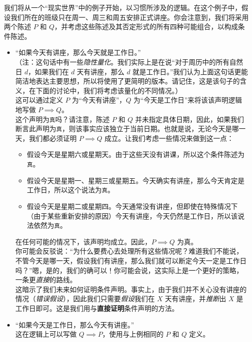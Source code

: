 \begin{example}
    我们将从一个``现实世界''中的例子开始，以习惯所涉及的逻辑。在这个例子中，假设我们所在的班级只在周一、周三和周五安排正式讲座。你会注意到，我们将采用两个陈述 $P$ 和 $Q$，并考虑这些陈述及其否定形式的所有四种可能组合，以构成条件陈述。
    \begin{itemize}
        \item ``如果今天有讲座，那么今天就是工作日。''\\
        （注：这句话中有一些\emph{隐性量化}。我们实际上是在说``对于周历中的所有自然日 $d$，如果我们在 $d$ 天有讲座，那么 $d$ 就是工作日。''我们认为上面这句话更能简洁地表达主要思想，所以将使用了更简明的版本。请记住，这是该句子的含义，在下面的讨论中，我们将考虑该量化的不同情况。）\\
        这可以通过定义 $P$ 为``今天有讲座''，$Q$ 为``今天是工作日''来将该该声明逻辑地写做 $P \implies Q$。\\
        这个声明为\verb|真|吗？请注意，陈述 $P$ 和 $Q$ 并未指定具体日期，因此，如果我们断言此声明为\verb|真|，则该事实应该独立于当前日期。也就是说，无论今天是哪一天，我们都必须证明 $P \implies Q$ 成立。让我们考虑一些情况来做到这一点：
        \begin{itemize}[label=--]
            \item 假设今天是星期六或星期天。由于这些天没有讲课，所以这个条件陈述为\verb|真|。
            \item 假设今天是星期一、星期三或星期五。今天确实有讲座，那么今天肯定是工作日，所以这个说法为\verb|真|。
            \item 假设今天是星期二或星期四。今天通常没有讲座，但即使在特殊情况下（由于某些重新安排的原因）今天有讲座，今天仍然是工作日，所以该说法依然为\verb|真|。
        \end{itemize}
        在任何可能的情况下，该声明均成立。因此，$P \implies Q$ 为真。\\
        你可能会反驳说：``为什么要费心去处理所有这些情况呢？难道我们不能说，不管今天是哪一天，假设我们有讲座，那么我们就可以断定今天一定是工作日吗？''嗯，是的，我们的确可以！你可能会说，这实际上是一个更好的策略，一条更\emph{直接}的路线。\\
        这暗示了我们未来如何证明条件声明。事实上，由于我们并不关心没有讲座的情况（\emph{错误假设}），因此我们只需要\emph{假设}我们在 $X$ 天有讲座，并\emph{推断}出 $X$ 是工作日即可。这是我们用与\textbf{直接证明}条件声明的方法。
        \item ``如果今天是工作日，那么今天有讲座。''\\
            这在逻辑上可以写做 $Q \implies P$，使用与上例相同的 $P$ 和 $Q$ 定义。\\

\end{itemize}
\end{example}
